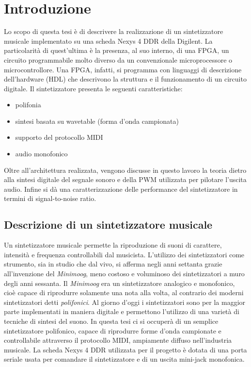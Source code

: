 \chapter{Introduzione}
Lo scopo di questa tesi è di descrivere la realizzazione di un sintetizzatore
musicale implementato su una scheda Nexys 4 DDR della Digilent.
La particolarità di quest'ultima è la presenza, al suo interno, di una FPGA,
un circuito programmabile molto diverso da un convenzionale microprocessore
o microcontrollore.
Una FPGA, infatti, si programma con linguaggi di descrizione dell'hardware (HDL)
che descrivono la struttura e il funzionamento di un circuito digitale.
Il sintetizzatore presenta le seguenti caratteristiche:
\begin{itemize}
   \item polifonia
   \item sintesi basata su wavetable (forma d'onda campionata)
   \item supporto del protocollo MIDI
   \item audio monofonico
\end{itemize}

Oltre all'architettura realizzata, vengono discusse in questo lavoro la teoria
dietro alla sintesi digitale del segnale sonoro e della PWM utilizzata
per pilotare l'uscita audio.
Infine si dà una caratterizzazione delle performance del sintetizzatore in termini
di signal-to-noise ratio.

\section{Descrizione di un sintetizzatore musicale}
Un sintetizzatore musicale permette la riproduzione di suoni di carattere, intensità e frequenza controllabili dal musicista.
L'utilizzo dei sintetizzatori come strumento, sia in studio che dal vivo, si afferma negli anni settanta grazie all'invenzione del \textit{Minimoog}, meno costoso e voluminoso dei sintetizzatori a muro degli anni sessanta.
Il \textit{Minimoog} era un sintetizzatore analogico e monofonico, cioè capace di riprodurre solamente una nota alla volta, al contrario dei moderni sintetizzatori detti \textit{polifonici}.
Al giorno d'oggi i sintetizzatori sono per la maggior parte implementati in maniera digitale e permettono l'utilizzo di una varietà di tecniche di sintesi del suono.
In questa tesi ci si occuperà di un semplice sintetizzatore polifonico, capace di riprodurre forme d'onda campionate e controllabile attraverso il protocollo MIDI, ampiamente diffuso nell'industria musicale.
La scheda Nexys 4 DDR utilizzata per il progetto è dotata di una porta seriale usata per comandare il sintetizzatore
 e di un uscita mini-jack monofonica.


